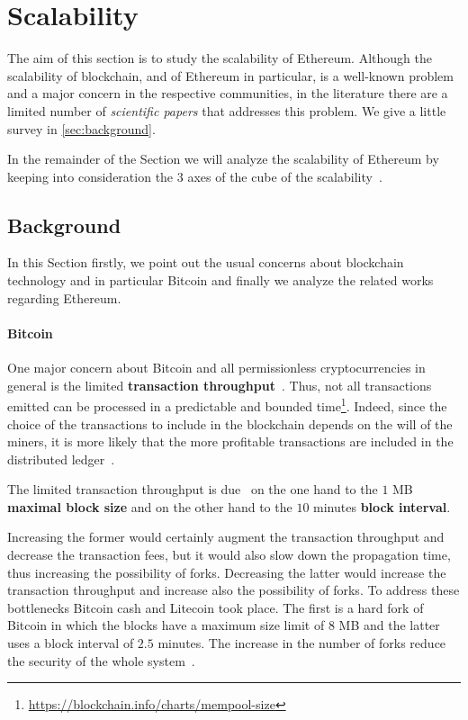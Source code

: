 \section{Scalability}
\label{sec:scalability}
The aim of this section is to study the scalability of Ethereum.
Although the scalability of blockchain, and of Ethereum in particular, is a
well-known problem and a major concern in the respective communities, in the
literature there are a limited number of \emph{scientific papers} that
addresses this problem.
We give a little survey in \autoref{sec:background}.

In the remainder of the Section we will analyze the scalability of Ethereum by
keeping into consideration the 3 axes of the cube of the
scalability~\cite{bib:art-of-scalability}.


\subsection{Background}

In this Section firstly, we point out the usual concerns about blockchain
technology and in particular Bitcoin and finally we analyze the related works
regarding Ethereum.

\paragraph{Bitcoin} 
One major concern about Bitcoin and all permissionless cryptocurrencies
in general is the limited \textbf{transaction
throughput}~\cite{bib:blockchain-challenges-opportunites-survey, bib:taxonomy}.
Thus, not all transactions emitted can be processed in a
predictable and bounded
time\footnote{\url{https://blockchain.info/charts/mempool-size}}.
Indeed, since the choice of the transactions
to include in the blockchain depends on the will of the miners,
it is more likely that the more profitable transactions are included
in the distributed
ledger~\cite{bib:blockchain-challenges-opportunites-survey,wood2018ethereum}.

The limited transaction throughput is due~\cite{bib:ghost} on the one hand to
the $1$ MB \textbf{maximal block size} and on the other
hand to the $10$ minutes \textbf{block interval}.

Increasing the former would certainly augment the transaction throughput and
decrease the transaction fees, but it would also slow down the propagation
time, thus increasing the possibility of forks. 
Decreasing the latter would increase the transaction throughput and increase
also the possibility of forks.
To address these bottlenecks Bitcoin cash and Litecoin
took place. The first is a hard fork of Bitcoin in which 
the blocks have a maximum size limit of $8$ MB and the
latter uses a block interval of $2.5$ minutes.
The increase in the number of forks reduce the security of the whole 
system~\cite{bib:ghost}.


